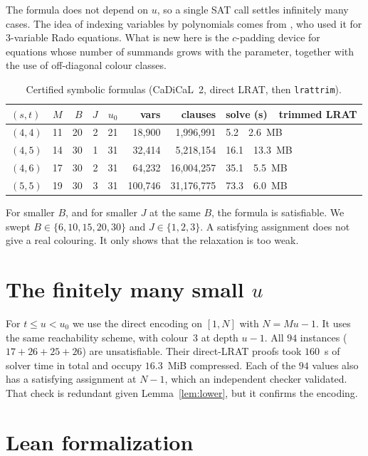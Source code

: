 \documentclass[11pt]{amsart}
\theoremstyle{definition}
\begin{document}
The formula does not depend on $u$, so a single SAT call settles
infinitely many cases. The idea of indexing variables by polynomials
comes from \cite{CDLW}, who used it for 3-variable Rado equations.
What is new here is the $c$-padding device for equations whose number
of summands grows with the parameter, together with the use of
off-diagonal colour classes.

\begin{table}[h]
\centering
\caption{Certified symbolic formulas (CaDiCaL~2, direct LRAT, then
\texttt{lrattrim}).}
\label{tab:sym}
\begin{tabular}{lrrrrrrl}
\toprule
$(s,t)$ & $M$ & $B$ & $J$ & $u_0$ & vars & clauses & solve (s)\ \ trimmed LRAT \\
\midrule
$(4,4)$ & 11 & 20 & 2 & 21 & 18{,}900  &  1{,}996{,}991 & 5.2\ \ 2.6~MB \\
$(4,5)$ & 14 & 30 & 1 & 31 & 32{,}414  &  5{,}218{,}154 & 16.1\ \ 13.3~MB \\
$(4,6)$ & 17 & 30 & 2 & 31 & 64{,}232  & 16{,}004{,}257 & 35.1\ \ 5.5~MB \\
$(5,5)$ & 19 & 30 & 3 & 31 & 100{,}746 & 31{,}176{,}775 & 73.3\ \ 6.0~MB \\
\bottomrule
\end{tabular}
\end{table}

For smaller $B$, and for smaller $J$ at the same $B$, the formula is
satisfiable. We swept $B\in\{6,10,15,20,30\}$ and $J\in\{1,2,3\}$. A
satisfying assignment does not give a real colouring. It only shows
that the relaxation is too weak.

\section{The finitely many small \texorpdfstring{$u$}{u}}

For $t\le u<u_0$ we use the direct encoding on $[1,N]$ with
$N=Mu-1$. It uses the same reachability scheme, with colour~3 at
depth $u-1$. All $94$ instances ($17+26+25+26$) are unsatisfiable.
Their direct-LRAT proofs took $160$~s of solver time in total and
occupy $16.3$~MiB compressed. Each of the $94$ values also has a
satisfying assignment at $N-1$, which an independent checker
validated. That check is redundant given Lemma~\ref{lem:lower}, but
it confirms the encoding.

\section{Lean formalization}
\end{document}
